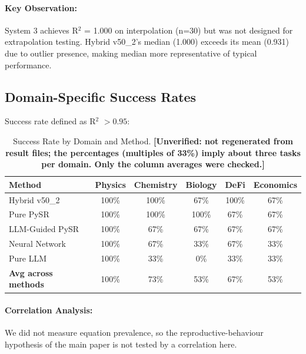 \documentclass[twoside,11pt]{article}
\begin{document}
\paragraph{Key Observation:} System 3 achieves R$^{2}$ = 1.000 on interpolation (n=30) but was not designed for extrapolation testing. Hybrid v50\_2's median (1.000) exceeds its mean (0.931) due to outlier presence, making median more representative of typical performance.

\subsection{Domain-Specific Success Rates}

Success rate defined as R$^{2}$ $> 0.95$:

\begin{table}[H]
\centering
\caption{Success Rate by Domain and Method.
  \textbf{[Unverified: not regenerated from result files; the percentages (multiples
  of 33\%) imply about three tasks per domain. Only the column averages were
  checked.]}}
\label{tab:domain_success_detailed}
\begin{tabular}{lccccc}
\toprule
\textbf{Method} & \textbf{Physics} & \textbf{Chemistry} & \textbf{Biology} & \textbf{DeFi} & \textbf{Economics} \\
\midrule
Hybrid v50\_2 & 100\% & 100\% & 67\% & 100\% & 67\% \\
Pure PySR & 100\% & 100\% & 100\% & 67\% & 67\% \\
LLM-Guided PySR & 100\% & 67\% & 67\% & 67\% & 67\% \\
Neural Network & 100\% & 67\% & 33\% & 67\% & 33\% \\
Pure LLM & 100\% & 33\% & 0\% & 33\% & 33\% \\
\midrule
\textbf{Avg across methods} & 100\% & 73\% & 53\% & 67\% & 53\% \\
\bottomrule
\end{tabular}
\end{table}

\paragraph{Correlation Analysis:} We did not measure equation prevalence, so the reproductive-behaviour hypothesis of the main paper is not tested by a correlation here.
\end{document}
